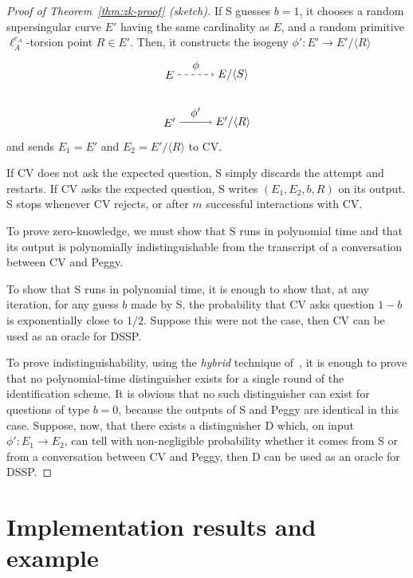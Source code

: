 \documentclass[jmc]{degruyter-journal-a}
\theoremstyle{definition}
\newcommand{\cyc}[1]{{\langle #1 \rangle}}
\begin{document}
\begin{proof}[Proof of Theorem~\ref{thm:zk-proof} (sketch)]
  If S guesses $b=1$, it chooses a random supersingular curve $E'$
  having the same cardinality as $E$, and a random primitive
  $\ell_A^{e_A}$-torsion point $R\in E'$. Then, it constructs the
  isogeny $\phi':E'\to E'/\cyc{R}$
  \begin{equation}
    \label{eq:zk1-horizontal}
    \begin{tikzpicture}[xscale=2,yscale=1.5,baseline=(current bounding box.east)]
      \node(0) at (0,0) {$E$};
      \node(S) at (1,0) {$E/\cyc{S}$};
      \node(R) at (0,-1) {$E'$};
      \node(SR) at (1,-1) {$E'/\cyc{R}$};
      \path[->,dashed] (0) edge node[auto] {$\phi$} (S);
      \path[->] (R) edge node[auto] {$\phi'$} (SR);
    \end{tikzpicture}
  \end{equation}
  and sends $E_1=E'$ and $E_2=E'/\cyc{R}$ to CV.

  If CV does not ask the expected question, S simply discards the
  attempt and restarts. If CV asks the expected question, S writes
  $(E_1,E_2,b,R)$ on its output. S stops whenever CV rejects, or after
  $m$ successful interactions with CV.

  To prove zero-knowledge, we must show that S runs in polynomial time
  and that its output is polynomially indistinguishable from the
  transcript of a conversation between CV and Peggy.

  To show that S runs in polynomial time, it is enough to show that, at
  any iteration, for any guess $b$ made by S, the probability that CV
  asks question $1-b$ is exponentially close to $1/2$. Suppose this
  were not the case, then CV can be used as an oracle for DSSP.
  
  To prove indistinguishability, using the \emph{hybrid} technique
  of~\cite[Claim~4.2]{goldreich+micali+widgerson91}, it is enough to
  prove that no polynomial-time distinguisher exists for a single
  round of the identification scheme. It is obvious that no such
  distinguisher can exist for questions of type $b=0$, because the
  outputs of S and Peggy are identical in this case. Suppose, now,
  that there exists a distinguisher D which, on input $\phi':E_1\to
  E_2$, can tell with non-negligible probability whether it comes from
  S or from a conversation between CV and Peggy, then D can be used as
  an oracle for DSSP.
\end{proof}

\section{Implementation results and example}\label{sec:imp}
\end{document}

